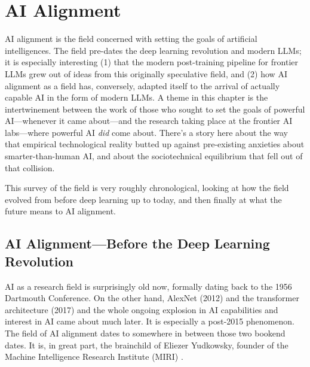 \chapter{AI Alignment}\label{ch_ai_alignment}

AI alignment is the field concerned with setting the goals of artificial
intelligences. The field pre-dates the deep learning revolution and modern
LLMs; it is especially interesting (1) that the modern post-training pipeline
for frontier LLMs grew out of ideas from this originally speculative field, and
(2) how AI alignment as a field has, conversely, adapted itself to the arrival
of actually capable AI in the form of modern LLMs. A theme in this chapter is
the intertwinement between the work of those who sought to set the goals of
powerful AI---whenever it came about---and the research taking place at the
frontier AI labs---where powerful AI \emph{did} come about. There's a story
here about the way that empirical technological reality butted up against
pre-existing anxieties about smarter-than-human AI, and about the
sociotechnical equilibrium that fell out of that collision.

This survey of the field is very roughly chronological, looking at how the
field evolved from before deep learning up to today, and then finally at what
the future means to AI alignment.

\section{AI Alignment---Before the Deep Learning Revolution}
AI as a research field is surprisingly old now, formally dating back to the
1956 Dartmouth Conference. On the other hand, AlexNet (2012)
\cite{krizhevsky2012imagenet} and the transformer architecture (2017)
\cite{vaswani2017attention} and the whole ongoing explosion in AI capabilities
and interest in AI came about much later. It is especially a post-2015
phenomenon. The field of AI alignment dates to somewhere in between those two
bookend dates. It is, in great part, the brainchild of Eliezer Yudkowsky,
founder of the Machine Intelligence Research Institute (MIRI)
\cite{yudkowsky2008factor}.

